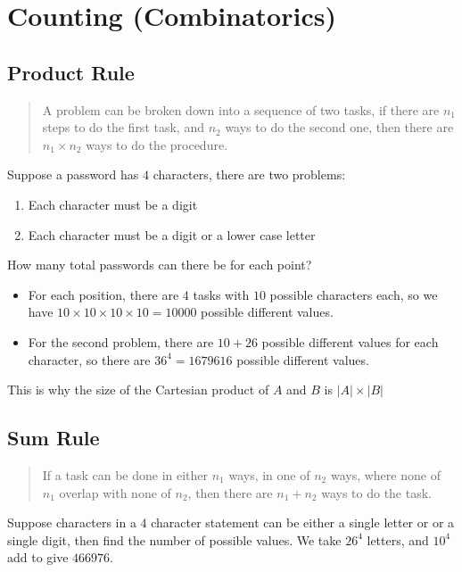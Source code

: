 \section{Counting (Combinatorics)}\label{sec:counting_combinatorics_}

\subsection{Product Rule}\label{sub:product_rule}

\begin{quote}
    A problem can be broken down into a sequence of two tasks, if there are \(n_1\) steps to do the first task, and \(n_2\) ways to do the second one, then there are \(n_1 \times n_2\) ways to do the procedure.
\end{quote}
Suppose a password has \(4\) characters, there are two problems:
\begin{enumerate}
    \item Each character must be a digit
    \item Each character must be a digit or a lower case letter
\end{enumerate}
How many total passwords can there be for each point?

\begin{itemize}
    \item For each position, there are \(4\) tasks with \(10\) possible characters each, so we have \(10\times 10\times 10\times 10 = 10000\) possible different values.
    \item For the second problem, there are \(10+26\) possible different values for each character, so there are \(36^4=1679616\) possible different values.
\end{itemize}
\begin{note}
    This is why the size of the Cartesian product of \(A\) and \(B\) is \(|A|\times |B|\)
\end{note}

\subsection{Sum Rule}\label{sub:sum_rule}

\begin{quote}
    If a task can be done in either \(n_1\) ways, in one of \(n_2\) ways, where none of \(n_1\) overlap with none of \(n_2\), then there are \(n_1+n_2\) ways to do the task.
\end{quote}
Suppose characters in a \(4\) character statement can be either a single letter or or a single digit, then find the number of possible values.
We take \(26^{4}\) letters, and \(10^{4}\) add to give \(466976\).

